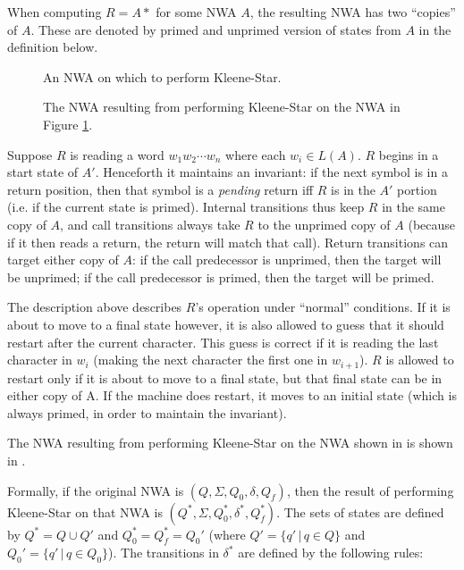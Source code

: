 When computing $R = A*$ for some
NWA $A$, the resulting NWA has two ``copies'' of $A$. These are denoted by
primed and unprimed version of states from $A$ in the definition below. 

\begin{figure}[p]
  \centering
  \caption{An NWA on which to perform Kleene-Star.}
  \label{Fi:Star1}
\end{figure}

\begin{figure}[p]
  \centering
  \caption{The NWA resulting from performing Kleene-Star on the NWA in Figure \ref{Fi:Star1}.}
  \label{Fi:Star2}
\end{figure}
\antistupidfloats


Suppose $R$ is reading a word $w_1w_2\cdots w_n$ where each $w_i \in
L(A)$. $R$ begins in a start state of $A'$. Henceforth it maintains an
invariant: if the next symbol is in a return position, then that symbol is a
\emph{pending} return iff $R$ is in the $A'$ portion (i.e. if the current state is
primed). Internal transitions thus keep $R$ in the same copy of $A$, and call
transitions always take $R$ to the unprimed copy of $A$ (because if it then
reads a return, the return will match that call). Return transitions can
target either copy of $A$: if the call predecessor is unprimed, then the
target will be unprimed; if the call predecessor is primed, then the target
will be primed.

The description above describes $R$'s operation under ``normal''
conditions. If it is about to move to a final state however, it is also allowed to guess that it
should restart after the current character. This guess is correct if it is
reading the last character in $w_i$
(making the next character the first one in $w_{i+1}$). $R$ is allowed to
restart only if it is about to move to a final state, but that final state
can be in either copy of A. If the machine
does restart, it moves to an initial state (which is always primed, in order to
maintain the invariant).

The NWA resulting from performing Kleene-Star on the NWA shown in
 is shown in .

Formally, if the original NWA is $(Q, \Sigma, Q_0, \delta, Q_f)$,
then the result of performing Kleene-Star on that NWA is $(Q^*, \Sigma,
Q_0^*, \delta^*, Q_f^*)$. The sets of states are defined by $Q^* = Q \cup
Q'$ and  $Q_0^* = Q_f^* = Q_0'$ (where $Q' = \{q'\, |\, q \in Q\}$ and $Q_0' =
\{q'\, |\, q \in Q_0\}$).
The transitions in $\delta^*$ are defined by the following rules:

